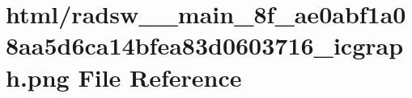 \hypertarget{radsw____main__8f__ae0abf1a08aa5d6ca14bfea83d0603716__icgraph_8png}{}\section{html/radsw\+\_\+\+\_\+main\+\_\+8f\+\_\+ae0abf1a08aa5d6ca14bfea83d0603716\+\_\+icgraph.png File Reference}
\label{radsw____main__8f__ae0abf1a08aa5d6ca14bfea83d0603716__icgraph_8png}
